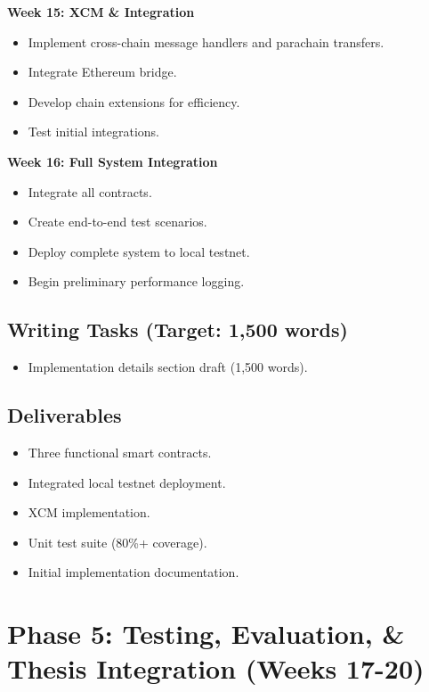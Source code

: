 \documentclass[12pt,a4paper]{article}
\begin{document}
\textbf{Week 15: XCM \& Integration}
\begin{itemize}
    \item Implement cross-chain message handlers and parachain transfers.
    \item Integrate Ethereum bridge.
    \item Develop chain extensions for efficiency.
    \item Test initial integrations.
\end{itemize}

\textbf{Week 16: Full System Integration}
\begin{itemize}
    \item Integrate all contracts.
    \item Create end-to-end test scenarios.
    \item Deploy complete system to local testnet.
    \item Begin preliminary performance logging.
\end{itemize}

\subsection*{Writing Tasks (Target: 1,500 words)}

\begin{itemize}
    \item Implementation details section draft (1,500 words).
\end{itemize}

\subsection*{Deliverables}

\begin{itemize}
    \item Three functional smart contracts.
    \item Integrated local testnet deployment.
    \item XCM implementation.
    \item Unit test suite (80\%+ coverage).
    \item Initial implementation documentation.
\end{itemize}

\section{Phase 5: Testing, Evaluation, \& Thesis Integration (Weeks 17-20)}
\end{document}
